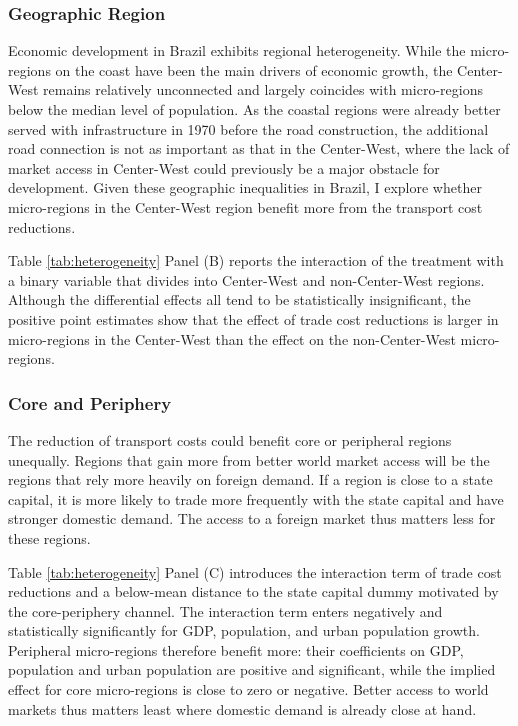 \documentclass[11pt]{article}
\begin{document}
\subsubsection{Geographic Region}

Economic development in Brazil exhibits regional heterogeneity. While the micro-regions on the coast have been the main drivers of economic growth, the Center-West remains relatively unconnected and largely coincides with micro-regions below the median level of population. As the coastal regions were already better served with infrastructure in 1970 before the road construction, the additional road connection is not as important as that in the Center-West, where the lack of market access in Center-West could previously be a major obstacle for development. Given these geographic inequalities in Brazil, I explore whether micro-regions in the Center-West region benefit more from the transport cost reductions. 

Table \ref{tab:heterogeneity} Panel (B) reports the interaction of the treatment with a binary variable that divides into Center-West and non-Center-West regions. Although the differential effects all tend to be statistically insignificant, the positive point estimates show that the effect of trade cost reductions is larger in micro-regions in the Center-West than the effect on the non-Center-West micro-regions. 

\subsubsection{Core and Periphery}

The reduction of transport costs could benefit core or peripheral regions unequally. Regions that gain more from better world market access will be the regions that rely more heavily on foreign demand. If a region is close to a state capital, it is more likely to trade more frequently with the state capital and have stronger domestic demand. The access to a foreign market thus matters less for these regions. 

Table \ref{tab:heterogeneity} Panel (C) introduces the interaction term of trade cost reductions and a below-mean distance to the state capital dummy motivated by the core-periphery channel. The interaction term enters negatively and statistically significantly for GDP, population, and urban population growth. Peripheral micro-regions therefore benefit more: their coefficients on GDP, population and urban population are positive and significant, while the implied effect for core micro-regions is close to zero or negative. Better access to world markets thus matters least where domestic demand is already close at hand. 
\end{document}
